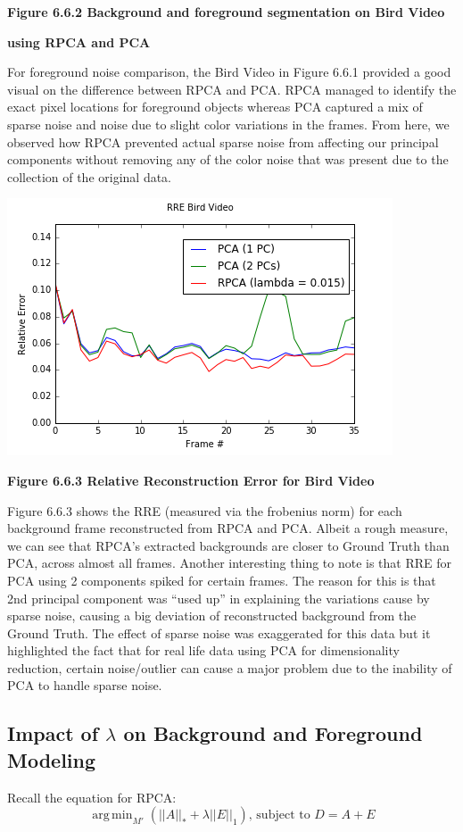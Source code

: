 \documentclass[11pt]{scrartcl} %
\DeclareMathOperator*{\argmin}{arg\,min}
\theoremstyle{plain}
\begin{document}
\begin{minipage}{\linewidth}
\begin{tabular}{ | c | m{2.8cm} | m{2.8cm} | m{2.8cm} | }
  \end{tabular}

\bigskip
\centerline{\textbf{Figure 6.6.2 Background and foreground segmentation on Bird Video }}
\centerline{\textbf{using RPCA and PCA}}
\bigskip
\egroup
\end{minipage}
For foreground noise comparison, the Bird Video in Figure 6.6.1 provided a good visual on the difference between RPCA and PCA. RPCA managed to identify the exact pixel locations for foreground objects whereas PCA captured a mix of sparse noise and noise due to slight color variations in the frames. From here, we observed how RPCA prevented actual sparse noise from affecting our principal components without removing any of the color noise that was present due to the collection of the original data.

\centerline{\includegraphics[width=\linewidth, width=100mm]{figures_video/crow/rre_015.png}}
\centerline{\textbf{Figure 6.6.3 Relative Reconstruction Error for Bird Video }}
\bigskip

Figure 6.6.3 shows the RRE (measured via the frobenius norm) for each background frame reconstructed from RPCA and PCA. Albeit a rough measure, we can see that RPCA’s extracted backgrounds are closer to Ground Truth than PCA, across almost all frames. Another interesting thing to note is that RRE for PCA using 2 components spiked for certain frames. The reason for this is that 2nd principal component was “used up” in explaining the variations cause by sparse noise, causing a big deviation of reconstructed background from the Ground Truth. The effect of sparse noise was exaggerated for this data but it highlighted the fact that for real life data using PCA for dimensionality reduction, certain noise/outlier can cause a major problem due to the inability of PCA to handle sparse noise.

\subsection{Impact of $\lambda$ on Background and Foreground Modeling}
Recall the equation for RPCA:
\[ \argmin_{M'}(||A||_* + \lambda||E||_1) \text{,  subject to  }  D = A + E \]
\end{document}
